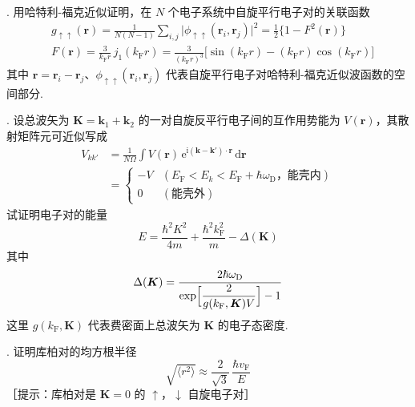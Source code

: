{.} 用哈特利-福克近似证明，在 $N$ 个电子系统中自旋平行电子对的关联函数
\begin{equation*}
\begin{aligned}
  &g_{\uparrow\uparrow}(\boldsymbol{r})=\frac{1}{N(N-1)}\sum_{i,j}
  \bigl|\phi_{\uparrow\uparrow}(\boldsymbol{r}_{i},\boldsymbol{r}_{j})\bigr|^{2}
  =\frac{1}{2}\bigl\{1-F^{2}(\boldsymbol{r})\bigr\}\\
  &F(\boldsymbol{r})=\frac{3}{k_{\mathrm{F}}r}\,j_{1}(k_{\mathrm{F}}r)
  =\frac{3}{(k_{\mathrm{F}}r)^{3}}\bigl[\sin(k_{\mathrm{F}}r)-(k_{\mathrm{F}}r)\cos(k_{\mathrm{F}}r)\bigr]
\end{aligned}
\end{equation*}
其中 $\boldsymbol{r}=\boldsymbol{r}_{i}-\boldsymbol{r}_{j}$、$\phi_{\uparrow\uparrow}(\boldsymbol{r}_{i},\boldsymbol{r}_{j})$ 代表自旋平行电子对哈特利-福克近似波函数的空间部分.

{.} 设总波矢为 $\boldsymbol{K}=\boldsymbol{k}_{1}+\boldsymbol{k}_{2}$ 的一对自旋反平行电子间的互作用势能为 $V(\boldsymbol{r})$，其散射矩阵元可近似写成
\begin{equation*}
\begin{aligned}
  V_{kk'}&=\frac{1}{N\Omega}\int V(\boldsymbol{r})\,
  \mathrm{e}^{\mathrm{i}(\boldsymbol{k}-\boldsymbol{k}')\cdot\boldsymbol{r}}\,\mathrm{d}\boldsymbol{r}\\
  &=\begin{cases}
    -V & \left(E_{\mathrm{F}}<E_{k}<E_{\mathrm{F}}+\hbar\omega_{\mathrm{D}}\text{，能壳内}\right)\\
    0 & \left(\text{能壳外}\right)
  \end{cases}
\end{aligned}
\end{equation*}
试证明电子对的能量
\begin{equation*}
  E=\frac{\hbar^{2}K^{2}}{4m}+\frac{\hbar^{2}k_{\mathrm{F}}^{2}}{m}-\Delta(\boldsymbol{K})
\end{equation*}
其中
\begin{equation*}
  \Delta(\boldsymbol{K})=\frac{2\hbar\omega_{\mathrm{D}}}{\exp\Bigl[\dfrac{2}{g(k_{\mathrm{F}},\boldsymbol{K})V}\Bigr]-1}
\end{equation*}
这里 $g(k_{\mathrm{F}},\boldsymbol{K})$ 代表费密面上总波矢为 $\boldsymbol{K}$ 的电子态密度.

{.} 证明库柏对的均方根半径
\begin{equation*}
  \sqrt{\langle r^{2}\rangle}\approx\frac{2}{\sqrt{3}}\,\frac{\hbar v_{\mathrm{F}}}{E}
\end{equation*}
［提示：库柏对是 $\boldsymbol{K}=0$ 的 $\uparrow$，$\downarrow$ 自旋电子对］

